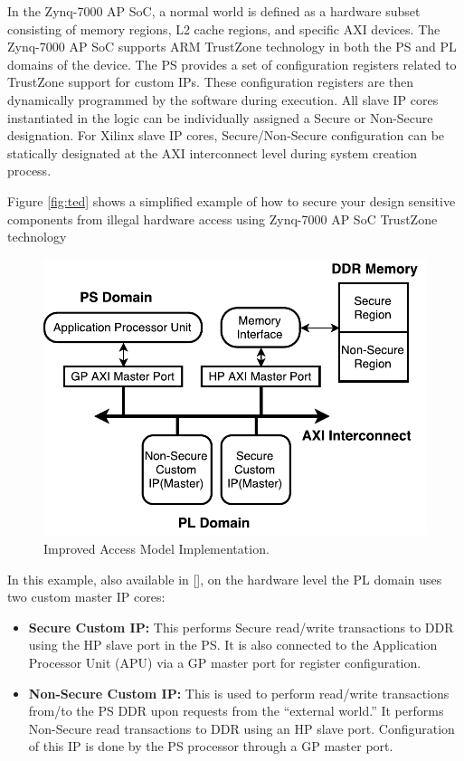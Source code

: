 \documentclass[sigconf]{acmart}
\theoremstyle{plain}
\theoremstyle{remark}
\begin{document}
In the Zynq-7000 AP SoC, a normal world is defined as a hardware subset consisting of memory regions, L2 cache regions, and specific AXI devices. The Zynq-7000 AP SoC supports ARM TrustZone technology in both the PS and PL domains of the device. The PS provides a set of configuration registers related to TrustZone support for custom IPs. These configuration registers are then dynamically programmed by the software during execution. All slave IP cores instantiated in the logic can be individually assigned a Secure or Non-Secure designation. For Xilinx slave IP cores, Secure/Non-Secure configuration can be statically designated at the AXI interconnect level during system creation process. 

Figure \ref{fig:ted} shows a simplified example of how to secure your design sensitive components from illegal hardware access using Zynq-7000 AP SoC TrustZone technology

\begin{figure}[hbt]
\centering 
\includegraphics[width=1\columnwidth]{figures/TrustZoneHardware.pdf} 
\caption{Improved Access Model Implementation.} %
\label{fig:trustzone} 
\end{figure}

In this example, also available in [], on the hardware level the PL domain uses two custom master IP cores: 

\begin{itemize}
\item \textbf{Secure Custom IP:} This performs Secure read/write transactions to DDR using the HP slave port in the PS. It is also connected to the Application Processor Unit (APU) via a GP master port for register configuration.
\item \textbf{Non-Secure Custom IP:} This is used to perform read/write transactions from/to the PS DDR upon requests from the “external world.” It performs Non-Secure
read transactions to DDR using an HP slave port. Configuration of this IP is done by the PS processor through a GP master port. 
\end{itemize}
\end{document}
